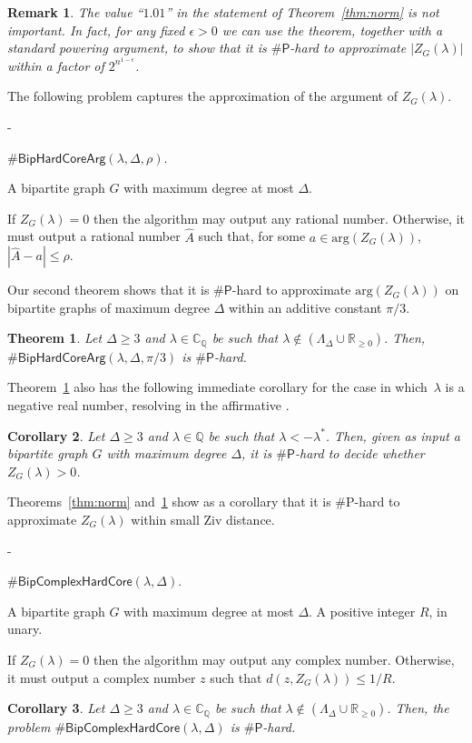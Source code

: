 \documentclass[11pt]{article}
\makeatletter
\newtheorem{theorem}{Theorem}
\newtheorem{corollary}[theorem]{Corollary}
\newtheorem*{remarkno}{Remark}
\renewcommand\arg{\text{arg}}
\def\numP{\#\mathsf{P}}
\def\Reals{\mathbb{R}}
\def\QQ{\mathbb{Q}}
\def\CQ{\mathbb{C}_{\mathbb{Q}}}
\def\LambdaD{\Lambda_\Delta}
\def\ArgHardCore#1{\#\ensuremath{\mathsf{BipHardCoreArg}(\lambda,\Delta,#1)}}
\def\ComplexHardCore{\#\ensuremath{\mathsf{BipComplexHardCore}(\lambda,\Delta)}}
\def\prob#1#2#3{\goodbreak\begin{list}{}{\labelwidth\z@ \itemindent-\leftmargin
                        \itemsep\z@  \topsep6\p@\@plus6\p@
                        \let\makelabel\descriptionlabel}
                \item[\it Name]#1
               \item[\it Instance]                #2
                \item[\it Output]#3
                \end{list}}
\makeatother
\begin{document}
 
\begin{remarkno}The value ``$1.01$'' in the statement of Theorem~\ref{thm:norm} is
not important. In fact, for any fixed $\epsilon>0$ we can
use the theorem, together with a standard powering argument, to
show that  it is $\numP$-hard to approximate $|Z_G(\lambda)|$ 
within a factor of $2^{n^{1-\epsilon}}$. 
\end{remarkno} 
  


The following problem captures the approximation of the argument of $Z_G(\lambda)$.  
  \prob{$\ArgHardCore{\rho}$.} 
 { A bipartite graph $G$ with maximum degree at
most $\Delta$.}
{If $Z_G(\lambda)=0$ then the algorithm may output any rational number. Otherwise, it must output  
a rational number $\widehat{A}$ such that, for some
$a \in  \arg(Z_{G}(\lambda))$,
$ |\widehat{A} - a | \leq \rho$.} 

Our second theorem shows that it is $\numP$-hard to approximate $\arg (Z_{G}(\lambda))$ on bipartite graphs of maximum degree $\Delta$ within an additive constant $\pi/3$. 
\begin{theorem}\label{thm:arg}
Let $\Delta\geq 3$ and $\lambda\in \CQ$ be such that $\lambda\not\in (\LambdaD \cup \Reals_{\geq 0})$. Then, $\ArgHardCore{\pi/3}$
 is $\numP$-hard.
\end{theorem}
 Theorem~\ref{thm:arg} also has the following immediate corollary for the case in which~$\lambda$ is a negative real number, resolving in the affirmative \cite[Conjecture 5.1]{Piyush}.
\begin{corollary}\label{cor:sign}
Let $\Delta\geq 3$ and 
$\lambda \in \QQ$  be such that
$\lambda<-\lambda^*$. Then, given as input a bipartite graph $G$ with maximum degree $\Delta$, it is $\numP$-hard to decide whether $Z_G(\lambda)>0$.
\end{corollary}

Theorems~\ref{thm:norm} and~\ref{thm:arg}
show as a corollary that it is \#P-hard to approximate $Z_G(\lambda)$ within small Ziv distance.
 
  \prob{$\ComplexHardCore$.} 
 { A  bipartite graph $G$ with maximum degree at
most $\Delta$. A positive integer $R$, in unary.}
{If $Z_G(\lambda)=0$ then the algorithm may output any complex number. Otherwise, it must output  
a  complex number $z$ such that
$d(z, Z_G(\lambda)) \leq   1/R$.}

\begin{corollary}\label{cor:Ziv}
Let $\Delta\geq 3$ and $\lambda\in \CQ$ be such that $\lambda\not\in (\LambdaD \cup \Reals_{\geq 0})$. Then, the problem 
$\ComplexHardCore$
 is $\numP$-hard.
\end{corollary}
 
\end{document}
